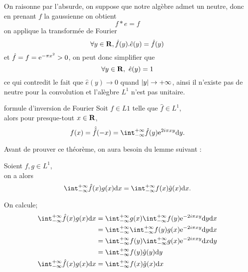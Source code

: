 \documentclass[a4paper,11pt, twoside]{article}
\begin{document}
\begin{Proof}
  On raisonne par l'absurde, on suppose que notre algèbre admet un neutre, donc en prenant $f$ la gaussienne on obtient 
  $$f*e=f$$
  on applique la transformée de Fourier
  $$\forall y\in\mathbf R, \hat f(y).\hat e(y)=\hat f(y)$$
  et $\hat f=f=\mathrm{e}^{-\pi x^2}>0$, on peut donc simplifier que 
  $$\forall y\in\mathbf R,\ \hat e(y)=1$$
  ce qui contredit le fait que $\hat e(y)\to 0$ quand $\left| y\right|\to+\infty$, ainsi il n'existe pas de neutre pour la convolution et l'alègbre $L^1$ n'est pas unitaire.
\end{Proof}


\begin{thC}{formule d'inversion de Fourier}
  Soit $f\in L 1$ telle que $\hat f\in L^1$,\\
  
  alors pour presque-tout $x\in\mathbf R$, 
  $$f(x)=\hat{\hat f}(-x)=\intr \hat f(y)\ex{2i\pi xy}\dy.$$
\end{thC}


Avant de prouver ce théorème, on aura besoin du lemme suivant : 


\begin{lemme}
  Soient $f,g\in L^1$,\\

  on a alors 
  $$\intr \hat f(x)g(x)\dx=\intr f(x)\hat g(x)\dx.$$
\end{lemme}


\begin{Proof}
  On calcule;
  \begin{align*}
    \intr \hat f(x)g(x)\dx&=\intr g(x)\intr f(y)\ex{-2i\pi xy}\dy\dx\\
    &=\intr\intr f(y)g(x)\ex{-2i\pi xy}\dy\dx\\
    &=\intr f(y)\intr g(x)\ex{-2i\pi xy}\dx\dy\\
    &=\intr f(y)\hat g(y)\dy\\
    \intr \hat f(x)g(x)\dx&=\intr f(x)\hat g(x)\dx
  \end{align*}
\end{Proof}
\end{document}
